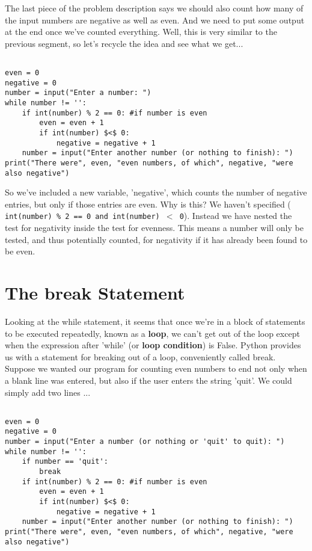The last piece of the problem description says we should also count   how many of the input numbers are negative as well as even. And we need   to put some output at the end once we've counted everything. Well, this   is very similar to the previous segment, so let's recycle the idea and   see what we get...
\begin{lstlisting}

even = 0
negative = 0
number = input("Enter a number: ")
while number != '':
    if int(number) % 2 == 0: #if number is even
        even = even + 1
        if int(number) $<$ 0:
            negative = negative + 1
    number = input("Enter another number (or nothing to finish): ")
print("There were", even, "even numbers, of which", negative, "were also negative")
\end{lstlisting}

So we've included a new variable, 'negative', which counts the   number of negative entries, but only if those entries are even. Why is   this? We haven't specified (
\texttt{int(number) \% 2 == 0 and int(number)   $<$ 0}). Instead we have nested the test for negativity inside   the test for evenness. This means a number will only be tested, and   thus potentially counted, for negativity if it has already been found   to be even.

\section{The break Statement}

Looking at the while statement, it seems that once we're in a block   of statements to be executed repeatedly, known as a   \textbf{loop}, we can't get out of the loop except when the   expression after 'while' (or \textbf{loop condition}) is False.   Python provides us with a statement for breaking out of a loop,   conveniently called break. Suppose we   wanted our program for counting even numbers to end not only when a   blank line was entered, but also if the user enters the string 'quit'.   We could simply add two lines ...
\begin{lstlisting}

even = 0
negative = 0
number = input("Enter a number (or nothing or 'quit' to quit): ")
while number != '':
    if number == 'quit':
        break
    if int(number) % 2 == 0: #if number is even
        even = even + 1
        if int(number) $<$ 0:
            negative = negative + 1
    number = input("Enter another number (or nothing to finish): ")
print("There were", even, "even numbers, of which", negative, "were also negative")
\end{lstlisting}

